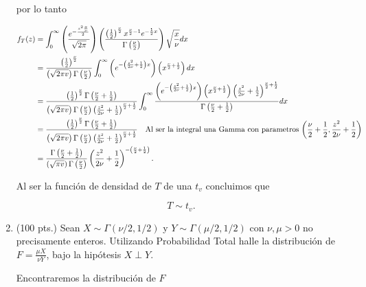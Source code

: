 \documentclass[letterpaper]{article}
\theoremstyle{definition}
\theoremstyle{lemathm}
\theoremstyle{lemathm}
\theoremstyle{lemademthm}
\newcommand{\pars}[1]{\left( #1 \right) }
\newcommand{\1}{\mathbbm{1}}
\begin{document}
\begin{enumerate}
		por lo tanto

		\begin{align*}
			f_T(z) &= \int_{0}^{\infty} \pars{\frac{e^{-\frac{z^2\frac{x}{\nu}}{2}}}{\sqrt{2\pi}}} \pars{\frac{\pars{\frac{1}{2}}^{\frac{\nu}{2}} x^{\frac{\nu}{2}-1} e^{-\frac{1}{2}x}}{\Gamma\pars{\frac{\nu}{2}}}} \sqrt{\frac{x}{\nu}} dx\\
			&= \frac{\pars{\frac{1}{2}}^{\frac{\nu}{2}}}{\pars{\sqrt{2\pi v}}{\Gamma\pars{\frac{\nu}{2}}}} \int_{0}^{\infty} \pars{e^{-\pars{\frac{z^2}{2\nu} + \frac{1}{2}}x}} \pars{x^{\frac{\nu}{2} + \frac{1}{2}}} dx\\
			&= \frac{\pars{\frac{1}{2}}^{\frac{\nu}{2}} \Gamma\pars{\frac{\nu}{2} + \frac{1}{2}}}{\pars{\sqrt{2\pi v}}{\Gamma\pars{\frac{\nu}{2}}}\pars{\frac{z^2}{2\nu} + \frac{1}{2}}^{\frac{\nu}{2} + \frac{1}{2}}} \int_{0}^{\infty} \frac{\pars{e^{-\pars{\frac{z^2}{2\nu} + \frac{1}{2}}x}} \pars{x^{\frac{\nu}{2} + \frac{1}{2}}}\pars{\frac{z^2}{2\nu} + \frac{1}{2}}^{\frac{\nu}{2} + \frac{1}{2}}}{\Gamma\pars{\frac{\nu}{2} + \frac{1}{2}}} dx\\
			&= \frac{\pars{\frac{1}{2}}^{\frac{\nu}{2}} \Gamma\pars{\frac{\nu}{2} + \frac{1}{2}}}{\pars{\sqrt{2\pi v}}{\Gamma\pars{\frac{\nu}{2}}}\pars{\frac{z^2}{2\nu} + \frac{1}{2}}^{\frac{\nu}{2} + \frac{1}{2}}} \text{\quad Al ser la integral una Gamma con parametros $\pars{\frac{\nu}{2} + \frac{1}{2},\frac{z^2}{2\nu} + \frac{1}{2}}$}\\
			&= \frac{\Gamma\pars{\frac{\nu}{2} + \frac{1}{2}}}{\pars{\sqrt{\pi v}}{\Gamma\pars{\frac{\nu}{2}}}} \pars{\frac{z^2}{2\nu} + \frac{1}{2}}^{-\pars{\frac{\nu}{2} + \frac{1}{2}}}.
		\end{align*}

		Al ser la función de densidad de $T$ de una $t_v$ concluimos que

		\[T \sim t_v.\]

		\newpage

		\item (100 pts.) Sean $X\sim\Gamma( \nu/2,1/2)$ y $Y\sim\Gamma( \mu/2,1/2)$ con $\nu,\mu>0$ no precisamente enteros. Utilizando Probabilidad Total halle la distribución de $F=\frac{\mu X}{\nu Y}$, bajo la hipótesis $X\perp Y$.
		
		Encontraremos la distribución de $F$


\end{enumerate}
\end{document}
